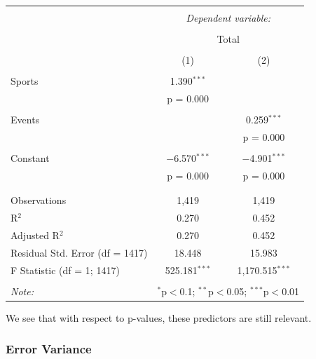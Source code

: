 \documentclass{mcmthesis}
\begin{document}
\begin{longtable}{@{\extracolsep{5pt}}lcc} 
\\[-1.8ex]\hline 
\hline \\[-1.8ex] 
 & \multicolumn{2}{c}{\textit{Dependent variable:}} \\ 
\cline{2-3} 
\\[-1.8ex] & \multicolumn{2}{c}{Total} \\ 
\\[-1.8ex] & (1) & (2)\\ 
\hline \\[-1.8ex] 
 Sports & 1.390$^{***}$ &  \\ 
  & p = 0.000 &  \\ 
  & & \\ 
 Events &  & 0.259$^{***}$ \\ 
  &  & p = 0.000 \\ 
  & & \\ 
 Constant & $-$6.570$^{***}$ & $-$4.901$^{***}$ \\ 
  & p = 0.000 & p = 0.000 \\ 
  & & \\ 
\hline \\[-1.8ex] 
Observations & 1,419 & 1,419 \\ 
R$^{2}$ & 0.270 & 0.452 \\ 
Adjusted R$^{2}$ & 0.270 & 0.452 \\ 
Residual Std. Error (df = 1417) & 18.448 & 15.983 \\ 
F Statistic (df = 1; 1417) & 525.181$^{***}$ & 1,170.515$^{***}$ \\ 
\hline 
\hline \\[-1.8ex] 
\textit{Note:}  & \multicolumn{2}{r}{$^{*}$p$<$0.1; $^{**}$p$<$0.05; $^{***}$p$<$0.01} \\ 
\end{longtable} 

We see that with respect to p-values, these predictors are still relevant. 


\subsubsection{Error Variance}
\end{document}
